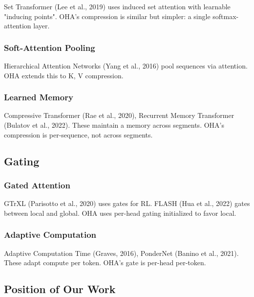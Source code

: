Set Transformer (Lee et al., 2019) uses induced set attention with 
learnable "inducing points". OHA's compression is similar but simpler: 
a single softmax-attention layer.

\subsubsection{Soft-Attention Pooling}

Hierarchical Attention Networks (Yang et al., 2016) pool sequences via 
attention. OHA extends this to K, V compression.

\subsubsection{Learned Memory}

Compressive Transformer (Rae et al., 2020), Recurrent Memory Transformer 
(Bulatov et al., 2022). These maintain a memory across segments. OHA's 
compression is per-sequence, not across segments.

\subsection{Gating}

\subsubsection{Gated Attention}

GTrXL (Parisotto et al., 2020) uses gates for RL. FLASH (Hua et al., 2022) 
gates between local and global. OHA uses per-head gating initialized to 
favor local.

\subsubsection{Adaptive Computation}

Adaptive Computation Time (Graves, 2016), PonderNet (Banino et al., 2021). 
These adapt compute per token. OHA's gate is per-head per-token.

\subsection{Position of Our Work}

